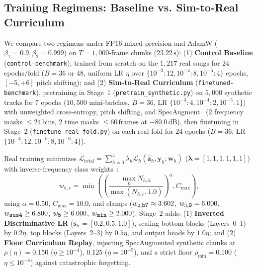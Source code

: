 \subsection{Training Regimens: Baseline vs. Sim-to-Real Curriculum}\label{subsec:training_regimens}

We compare two regimens under FP16 mixed precision and AdamW ($\beta_1=0.9, \beta_2=0.999$) on $T = 1{,}000$-frame chunks ($23.22\,\text{s}$): (1) \textbf{Control Baseline} ({\small\texttt{control-\allowbreak benchmark}}), trained from scratch on the $1{,}217$ real songs for $24$ epochs/fold ($B=36$ or $48$, uniform LR $\eta$ over $\{10^{-3}\!:\!12, 10^{-4}\!:\!8, 10^{-5}\!:\!4\}$ epochs, $[-5, +6]$ pitch shifting); and (2) \textbf{Sim-to-Real Curriculum} ({\small\texttt{finetuned-\allowbreak benchmark}}), pretraining in Stage~1 ({\small\texttt{pretrain\_synthetic.py}}) on $5{,}000$ synthetic tracks for $7$ epochs ($10{,}500$ mini-batches, $B=36$, LR $\{10^{-3}\!:\!4, 10^{-4}\!:\!2, 10^{-5}\!:\!1\}$) with unweighted cross-entropy, pitch shifting, and SpecAugment~\cite{park2019specaugment} ($2$ frequency masks $\le 24\,\text{bins}$, $2$ time masks $\le 60\,\text{frames}$ at $-80.0\,\text{dB}$), then finetuning in Stage~2 ({\small\texttt{finetune\_real\_fold.py}}) on each real fold for $24$ epochs ($B=36$, LR $\{10^{-4}\!:\!12, 10^{-5}\!:\!8, 10^{-6}\!:\!4\}$).

Real training minimizes $\mathcal{L}_{\text{total}} = \sum_{h=0}^5 \lambda_h \mathcal{L}_h(\hat{\mathbf{z}}_h, \mathbf{y}_h; \mathbf{w}_h)$ ($\boldsymbol{\lambda} = [1, 1, 1, 1, 1, 1]$) with inverse-frequency class weights~\cite{jiang2019large,akram2026chordformer}:
\begin{equation}\label{eq:class_reweighting}
  w_{h, c} = \min \left( \left( \frac{\max_k N_{h, k}}{\max(N_{h, c}, 1.0)} \right)^{\alpha}, C_{\max} \right),
\end{equation}
using $\alpha = 0.50$, $C_{\max} = 10.0$, and clamps ($w_{2,\text{\small\texttt{b7}}} \approx 3.602$, $w_{3,\text{\small\texttt{9}}} = 6.000$, $w_{\text{\small\texttt{sus4}}} \ge 6.800$, $w_{\text{\small\texttt{5}}} \ge 6.000$, $w_{\text{\small\texttt{min}}} \ge 2.000$). Stage~2 adds: (1) \textbf{Inverted Discriminative LR} ($\mathbf{s}_{\text{lr}} = [0.2, 0.5, 1.0]$), scaling bottom blocks (Layers~0--1) by $0.2\eta$, top blocks (Layers~2--3) by $0.5\eta$, and output heads by $1.0\eta$; and (2) \textbf{Floor Curriculum Replay}, injecting SpecAugmented synthetic chunks at $\rho(\eta) = 0.150$ ($\eta \ge 10^{-4}$), $0.125$ ($\eta = 10^{-5}$), and a strict floor $\rho_{\min} = 0.100$ ($\eta \le 10^{-6}$) against catastrophic forgetting.
